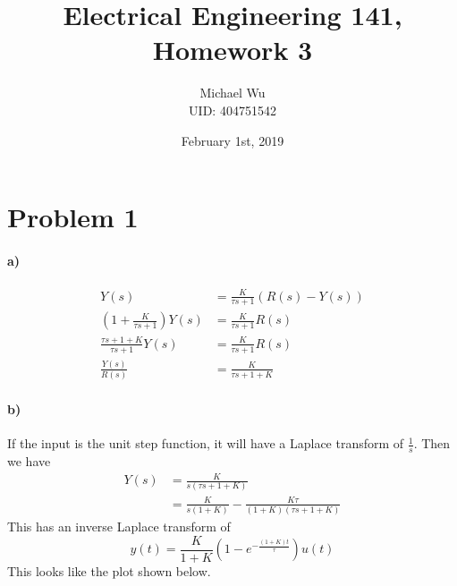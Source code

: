\documentclass[12pt]{article}
\begin{document}
\title{Electrical Engineering 141, Homework 3}
\date{February 1st, 2019}
\author{Michael Wu\\UID: 404751542}
\maketitle

\section*{Problem 1}

\paragraph{a)}

\begin{align*}
    Y(s) &= \frac{K}{\tau s + 1}(R(s) - Y(s))\\
    \left(1+\frac{K}{\tau s + 1}\right)Y(s) &= \frac{K}{\tau s + 1}R(s)\\
    \frac{\tau s + 1 + K}{\tau s + 1} Y(s) &= \frac{K}{\tau s + 1}R(s)\\
    \frac{Y(s)}{R(s)} &= \frac{K}{\tau s + 1 + K}
\end{align*}

\paragraph{b)}

If the input is the unit step function, it will have a Laplace transform of \(\frac{1}{s}\). Then we have
\begin{align*}
    Y(s) &= \frac{K}{s(\tau s + 1 + K)}\\
    &=\frac{K}{s(1+K)}-\frac{K\tau}{(1+K)(\tau s + 1 + K)}
\end{align*}
This has an inverse Laplace transform of
\[y(t) = \frac{K}{1+K}\left(1 - e^{-\frac{(1+K)t}{\tau}}\right)u(t)\]
This looks like the plot shown below.
\begin{center}
\end{center}
\end{document}
